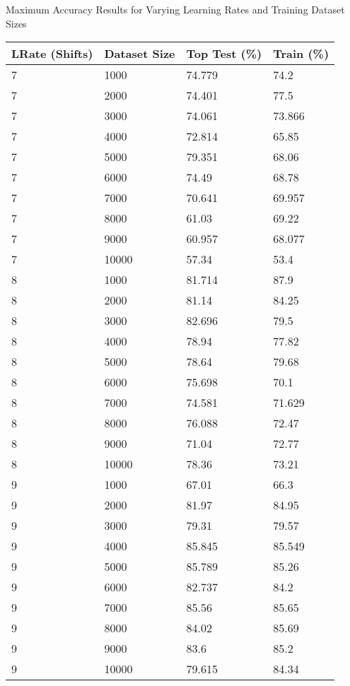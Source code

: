 \begin{table}
	\centering 
	\large Maximum Accuracy Results for Varying Learning Rates and Training Dataset Sizes\\
	\normalsize
	\begin{tabular}{|l|l|l|l|}
		\hline
		\textbf{LRate (Shifts)}	& \textbf{Dataset Size} & \textbf{Top Test (\%)} & \textbf{Train (\%) }\\\hline 
7	&1000	&74.779	&74.2     \\\hline
7	&2000	&74.401	&77.5     \\\hline
7	&3000	&74.061	&73.866   \\\hline
7	&4000	&72.814	&65.85    \\\hline
7	&5000	&79.351	&68.06    \\\hline
7	&6000	&74.49	&68.78    \\\hline
7	&7000	&70.641	&69.957   \\\hline
7	&8000	&61.03	&69.22    \\\hline
7	&9000	&60.957	&68.077   \\\hline
7	&10000	&57.34	&53.4     \\\hline
8	&1000	&81.714	&87.9     \\\hline
8	&2000	&81.14	&84.25    \\\hline
8	&3000	&82.696	&79.5     \\\hline
8	&4000	&78.94	&77.82    \\\hline
8	&5000	&78.64	&79.68    \\\hline
8	&6000	&75.698	&70.1     \\\hline
8	&7000	&74.581	&71.629   \\\hline
8	&8000	&76.088	&72.47    \\\hline
8	&9000	&71.04	&72.77    \\\hline
8	&10000	&78.36	&73.21    \\\hline
9	&1000	&67.01	&66.3     \\\hline
9	&2000	&81.97	&84.95    \\\hline
9	&3000	&79.31	&79.57    \\\hline
9	&4000	&85.845	&85.549   \\\hline
9	&5000	&85.789	&85.26    \\\hline
9	&6000	&82.737	&84.2     \\\hline
9	&7000	&85.56	&85.65    \\\hline
9	&8000	&84.02	&85.69    \\\hline
9	&9000	&83.6	&85.2     \\\hline
9	&10000	&79.615	&84.34    \\\hline

\end{tabular}
\end{table}
